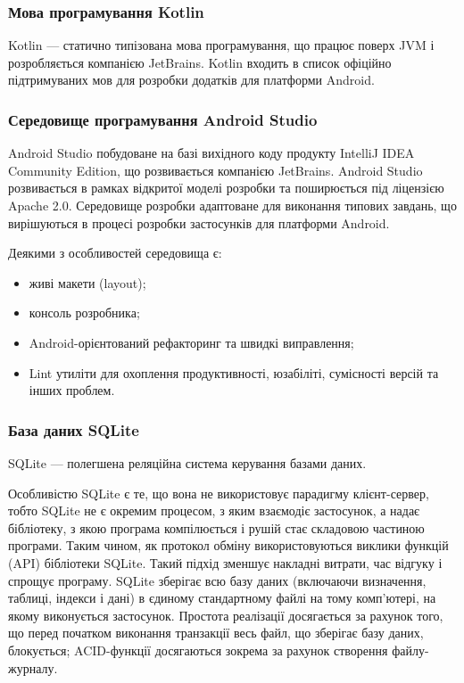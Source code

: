 \subsubsection{Мова програмування Kotlin}
Kotlin --- статично типізована мова програмування, що працює поверх JVM і розробляється компанією JetBrains.
Kotlin входить в список офіційно підтримуваних мов для розробки додатків для платформи Android.

\subsubsection{Середовище програмування Android Studio}
Android Studio побудоване на базі вихідного коду продукту IntelliJ IDEA Community Edition, що розвивається компанією JetBrains. 
Android Studio розвивається в рамках відкритої моделі розробки та поширюється під ліцензією Apache 2.0.
Середовище розробки адаптоване для виконання типових завдань, що вирішуються в процесі розробки застосунків для платформи Android.

Деякими з особливостей середовища є:
\begin{itemize}
\item живі макети (layout);
\item консоль розробника;
\item Android-орієнтований рефакторинг та швидкі виправлення;
\item Lint утиліти для охоплення продуктивності, юзабіліті, сумісності версій та інших проблем.
\end{itemize}

\subsubsection{База даних SQLite}
SQLite --- полегшена реляційна система керування базами даних.

Особливістю SQLite є те, що вона не використовує парадигму клієнт-сервер, тобто SQLite не є окремим процесом, з яким взаємодіє застосунок, а надає бібліотеку, з якою програма компілюється і рушій стає складовою частиною програми. 
Таким чином, як протокол обміну використовуються виклики функцій (API) бібліотеки SQLite. Такий підхід зменшує накладні витрати, час відгуку і спрощує програму. 
SQLite зберігає всю базу даних (включаючи визначення, таблиці, індекси і дані) в єдиному стандартному файлі на тому комп'ютері, на якому виконується застосунок. 
Простота реалізації досягається за рахунок того, що перед початком виконання транзакції весь файл, що зберігає базу даних, блокується; ACID-функції досягаються зокрема за рахунок створення файлу-журналу.

